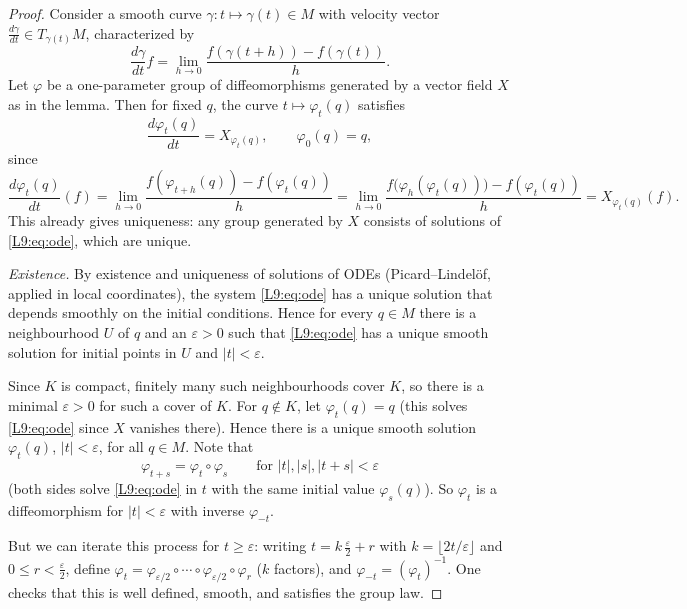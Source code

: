 \documentclass[11pt,openany]{book}
\theoremstyle{plain}
\theoremstyle{definition}
\theoremstyle{remark}
\newcommand{\added}[1]{{\color{addcol}#1}}
\newcommand{\unclear}[1]{\marginpar{\raggedright\scriptsize\color{flagcol}\textbf{?} #1}}
\newcommand{\abs}[1]{\left\lvert #1 \right\rvert}
\begin{document}
\begin{proof}
Consider a smooth curve $\gamma\colon t\mapsto\gamma(t)\in M$ with velocity vector
$\frac{d\gamma}{dt}\in T_{\gamma(t)}M$, characterized by
\[
  \frac{d\gamma}{dt}f=\lim_{h\to0}\frac{f(\gamma(t+h))-f(\gamma(t))}{h}.
\]
Let $\varphi$ be a one-parameter group of diffeomorphisms generated by a vector field $X$ as in
the lemma. Then for fixed $q$, the curve $t\mapsto\varphi_t(q)$ satisfies
\begin{equation}\label{L9:eq:ode}
  \frac{d\varphi_t(q)}{dt}=X_{\varphi_t(q)},\qquad \varphi_0(q)=q ,
\end{equation}
since
\[
  \frac{d\varphi_t(q)}{dt}(f)=\lim_{h\to0}\frac{f(\varphi_{t+h}(q))-f(\varphi_t(q))}{h}
  =\lim_{h\to0}\frac{f\bigl(\varphi_h(\varphi_t(q))\bigr)-f(\varphi_t(q))}{h}
  =X_{\varphi_t(q)}(f).
\]
\added{This already gives uniqueness: any group generated by $X$ consists of solutions of
\eqref{L9:eq:ode}, which are unique.}

\emph{Existence.} By existence and uniqueness of solutions of ODEs (Picard--Lindel\"of, applied in
local coordinates), the system \eqref{L9:eq:ode} has a unique solution that depends smoothly on
the initial conditions. Hence for every $q\in M$ there is a neighbourhood $U$ of $q$ and
an $\varepsilon>0$ such that \eqref{L9:eq:ode} has a unique smooth solution for initial points in
$U$ and $\abs{t}<\varepsilon$.

Since $K$ is compact, \added{finitely many such neighbourhoods cover $K$, so} there is a minimal
$\varepsilon>0$ for such a cover of $K$. For $q\notin K$, let $\varphi_t(q)=q$
\added{(this solves \eqref{L9:eq:ode} since $X$ vanishes there)}. Hence there is a unique smooth
solution $\varphi_t(q)$, $\abs{t}<\varepsilon$, for all $q\in M$.
Note that
\[
  \varphi_{t+s}=\varphi_t\circ\varphi_s\qquad\text{for }\abs{t},\abs{s},\abs{t+s}<\varepsilon
\]
\added{(both sides solve \eqref{L9:eq:ode} in $t$ with the same initial value $\varphi_s(q)$)}.
So $\varphi_t$ is a diffeomorphism for $\abs{t}<\varepsilon$ \added{with inverse $\varphi_{-t}$}.

But we can iterate this process for $t\ge\varepsilon$:
\unclear{``by LNP\dots''; step size $\varepsilon$ vs.\ $\varepsilon/2$ unclear}
writing $t=k\,\tfrac{\varepsilon}{2}+r$ with $k=\lfloor 2t/\varepsilon\rfloor$ and
$0\le r<\tfrac{\varepsilon}{2}$, \added{define
$\varphi_t=\varphi_{\varepsilon/2}\circ\cdots\circ\varphi_{\varepsilon/2}\circ\varphi_r$ ($k$ factors),
and $\varphi_{-t}=(\varphi_t)^{-1}$. One checks that this is well defined, smooth, and satisfies the group law.}
\end{proof}
\end{document}
